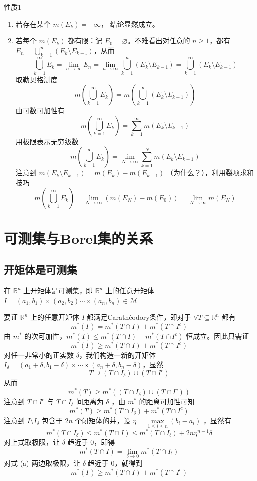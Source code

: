 \documentclass{ctexbook}
\newcommand{\no}{\noindent}
\newcommand{\pro}{\no{\bf 证明：}}
\newcommand{\R}{\mathbb{R}}
\newcommand{\ITEMS}{\begin{enumerate}[leftmargin=4em]}
\newcommand{\ITEME}{\end{enumerate}}
\begin{document}
\pro 性质1
\ITEMS
	\item 若存在某个 $m(E_k) = +\infty$， 结论显然成立。
	\item 若每个 $m(E_k)$ 都有限：记 $E_0 = \varnothing$。不难看出对任意的 $n\ge 1$，都有 $E_n=\bigcup\limits_{k=1}^{n}( E_k\setminus E_{k-1})$，从而 $$\bigcup\limits_{k=1}^{\infty}E_k=\lim\limits_{n\to \infty} E_n=\lim\limits_{n\to \infty}\bigcup\limits_{k=1}^{n}( E_k\setminus E_{k-1})=\bigcup\limits_{k=1}^{\infty}( E_k\setminus E_{k-1})$$
	取勒贝格测度
	\[
		m\left(\bigcup_{k=1}^\infty E_k\right) = m\left(\bigcup_{k=1}^\infty ( E_k\setminus E_{k-1})\right)
	\]
	由可数可加性有
	\[
		m\left(\bigcup_{k=1}^\infty E_k\right) = \sum_{k=1}^\infty m\left(  E_k\setminus E_{k-1}\right)
	\]
	用极限表示无穷级数
	\[
		m\left(\bigcup_{k=1}^\infty E_k\right) = \lim_{N\to\infty}\sum_{k=1}^N m\left(  E_k\setminus E_{k-1}\right)
	\]
	注意到 $m\left( E_k\setminus E_{k-1}\right)= m(E_k)-m(E_{k-1})$ （为什么？），利用裂项求和技巧
	\[
		m\left(\bigcup_{k=1}^\infty E_k\right) = \lim_{N\to\infty} \left(  m(E_N) - m(E_0)\right) =\lim_{N\to\infty} m(E_N)
	\]
\ITEME

\section{可测集与Borel集的关系}

\subsection{开矩体是可测集}
在 $\R^n$ 上开矩体是可测集，即 $\R^n$ 上的任意开矩体 $I = (a_1,b_1) \times (a_2,b_2) \cdots \times (a_n,b_n) \in \mathcal{M}$

\pro 要证 $\R^n$ 上的任意开矩体 $I$ 都满足Carathéodory条件，即对于 $\forall T \subseteq \R^n$ 都有
\[
	m^*(T) = m^*(T\cap I) + m^*(T\cap I^c)
\]
由 $m^*$ 的次可加性，$m^*(T) \le m^*(T\cap I) + m^*(T\cap I^c)$ 恒成立。因此只需证
\[
	m^*(T) \ge m^*(T\cap I) + m^*(T\cap I^c)
\]
对任一非常小的正实数 $\delta$，我们构造一新的开矩体 $I_\delta = (a_1 + \delta, b_1 - \delta) \times \cdots \times (a_n + \delta, b_n - \delta)$，显然
\[
	T\supseteq (T \cap I_\delta) \cup (T \cap I^c)
\]
从而 
\[
m^*(T) \ge m^*((T \cap I_\delta) \cup (T \cap I^c))
\]
注意到 $T \cap I^c$ 与 $T \cap I_\delta$ 间距离为 $\delta$ ，由 $m^*$ 的距离可加性可知
\[
	m^*(T) \ge m^*(T \cap I_\delta) + m^*(T \cap I^c) \tag{a}
\]
注意到 $I \setminus I_\delta$ 包含于 $2n$ 个闭矩体的并，设 $\eta = \max\limits_{1\le i\le n} (b_i-a_i)$ ，显然有
\[
 m^*(T \cap I_\delta) \le m^*(T\cap I) \le m^*(T \cap I_\delta) + 2n \eta^{n-1} \delta
\]
对上式取极限，让 $\delta$ 趋近于 $0$，即得
\[
	m^*(T\cap I) = \lim_{\delta \to 0}m^*(T \cap I_\delta)
\]
对式 (a) 两边取极限，让 $\delta$ 趋近于 $0$，就得到
\[
	m^*(T) \ge m^*(T\cap I) + m^*(T\cap I^c)
\]
\end{document}
